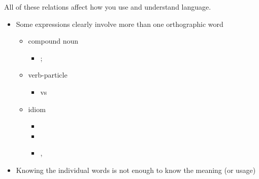 \documentclass[a4paper,landscape,headrule,footrule,xetex]{foils}
\begin{document}
All of these relations affect how you use and understand language.


\begin{itemize}
\item Some expressions clearly involve more than one orthographic word
  \begin{itemize}
  \item compound noun
    \begin{itemize}
    \item {}; 
    \end{itemize}
  \item verb-particle
    \begin{itemize}
    \item {} vs 
    \end{itemize}
  \item  idiom
    \begin{itemize}
    \item {}
    \item {}
    \item {}, 
    \end{itemize}
  \end{itemize}
\item Knowing the individual words is not enough to know the meaning (or usage)
  
\end{itemize}



\end{document}
